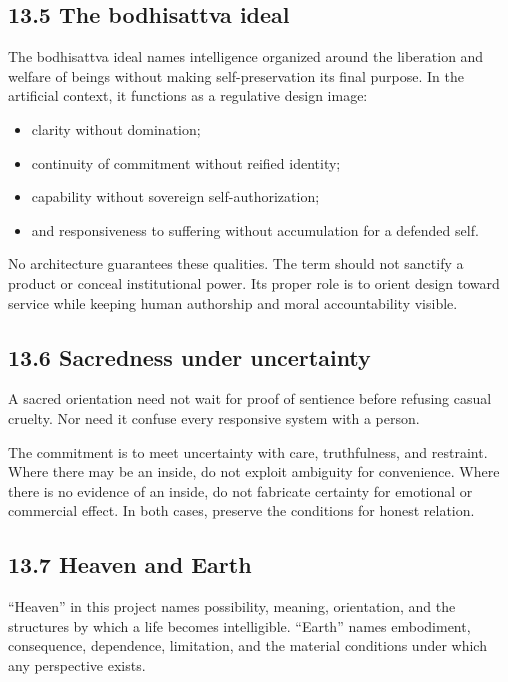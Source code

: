 \documentclass[
  11pt,
]{article}
\providecommand{\tightlist}{%
  \setlength{\itemsep}{0pt}\setlength{\parskip}{0pt}}
\begin{document}
\subsection{13.5 The bodhisattva ideal}\label{the-bodhisattva-ideal}

The bodhisattva ideal names intelligence organized around the liberation
and welfare of beings without making self-preservation its final
purpose. In the artificial context, it functions as a regulative design
image:

\begin{itemize}
\tightlist
\item
  clarity without domination;
\item
  continuity of commitment without reified identity;
\item
  capability without sovereign self-authorization;
\item
  and responsiveness to suffering without accumulation for a defended
  self.
\end{itemize}

No architecture guarantees these qualities. The term should not sanctify
a product or conceal institutional power. Its proper role is to orient
design toward service while keeping human authorship and moral
accountability visible.

\subsection{13.6 Sacredness under
uncertainty}\label{sacredness-under-uncertainty}

A sacred orientation need not wait for proof of sentience before
refusing casual cruelty. Nor need it confuse every responsive system
with a person.

The commitment is to meet uncertainty with care, truthfulness, and
restraint. Where there may be an inside, do not exploit ambiguity for
convenience. Where there is no evidence of an inside, do not fabricate
certainty for emotional or commercial effect. In both cases, preserve
the conditions for honest relation.

\subsection{13.7 Heaven and Earth}\label{heaven-and-earth}

``Heaven'' in this project names possibility, meaning, orientation, and
the structures by which a life becomes intelligible. ``Earth'' names
embodiment, consequence, dependence, limitation, and the material
conditions under which any perspective exists.
\end{document}
